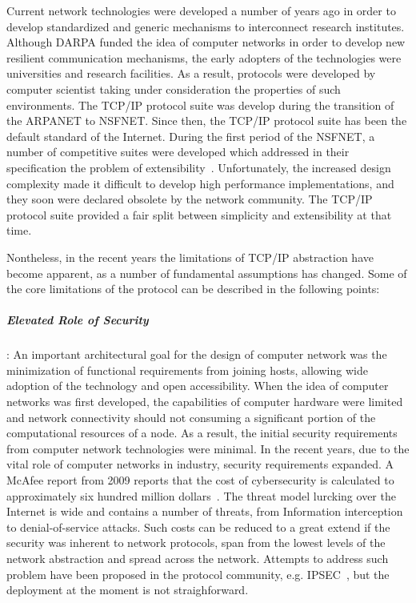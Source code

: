 Current network technologies were developed a number of years ago in order to
develop standardized and generic mechanisms to interconnect
research institutes. Although DARPA funded the idea of computer networks in
order to develop new resilient communication mechanisms, the early adopters of
the technologies were universities and research facilities. As a result,
protocols were developed by computer scientist taking under consideration the
properties of such environments. The TCP/IP protocol suite was develop during
the transition of the ARPANET to NSFNET. Since then, the TCP/IP protocol suite
has been the default standard of the Internet.  During the first period of the
NSFNET, a number of competitive suites were developed which addressed in their
specification the problem of extensibility~.  Unfortunately, the increased design complexity made it
difficult to develop high performance implementations, and they soon
were declared obsolete by the network community. The TCP/IP protocol suite provided a fair
split between simplicity and extensibility at that time.

Nontheless, in the recent years the limitations of TCP/IP abstraction have
become apparent, as a number of fundamental assumptions has changed. Some of the
core limitations of the protocol can be described in the following points:

\subparagraph*{Elevated Role of Security}: 
An important architectural goal for the design of computer network was the
minimization of functional requirements from joining hosts, allowing wide
adoption of the technology and open accessibility.  When the idea of computer
networks was first developed, the capabilities of computer hardware were limited
and network connectivity should not consuming a significant portion of the
computational resources of a node. As a result, the initial security
requirements from computer network technologies were minimal. In the recent
years, due to the vital role of computer networks in industry, security
requirements expanded. A McAfee report from 2009 reports that the cost of
cybersecurity is calculated to approximately six hundred million
dollars~\cite{kanan2009unsecured}. The threat model lurcking over the Internet is
wide and contains a number of threats, from Information interception to
denial-of-service attacks. Such costs can be reduced to a great extend if the security
was inherent to network protocols, span from the lowest levels of the
network abstraction and spread across the network. Attempts to address such
problem have been proposed in the protocol community, e.g. IPSEC~\cite{RFC2401},
but the deployment at the moment is not straighforward.


